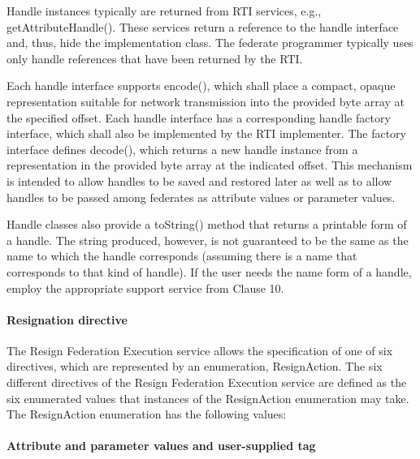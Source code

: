 \begin{compactstdpage}
    Handle instances typically are returned from RTI services, e.g., getAttributeHandle(). These services return a reference to the handle interface and, thus, hide the implementation class. The federate programmer typically uses only handle references that have been returned by the RTI.

    Each handle interface supports encode(), which shall place a compact, opaque representation suitable for network transmission into the provided byte array at the specified offset. Each handle interface has a corresponding handle factory interface, which shall also be implemented by the RTI implementer. The factory interface defines decode(), which returns a new handle instance from a representation in the provided byte array at the indicated offset. This mechanism is intended to allow handles to be saved and restored later as well as to allow handles to be passed among federates as attribute values or parameter values.

    Handle classes also provide a toString() method that returns a printable form of a handle. The string produced, however, is not guaranteed to be the same as the name to which the handle corresponds (assuming there is a name that corresponds to that kind of handle). If the user needs the name form of a handle, employ the appropriate support service from Clause 10.

    \paragraph{Resignation directive}

    The Resign Federation Execution service allows the specification of one of six directives, which are represented by an enumeration, ResignAction. The six different directives of the Resign Federation Execution service are defined as the six enumerated values that instances of the ResignAction enumeration may take. The ResignAction enumeration has the following values:


    \paragraph{Attribute and parameter values and user-supplied tag}


\end{compactstdpage}
